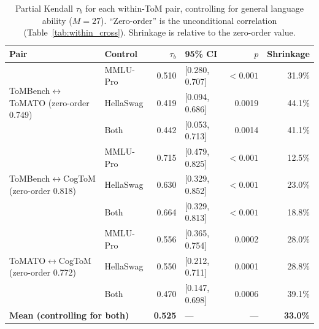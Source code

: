 \documentclass{article} %
\begin{document}
\begin{table}[h]
\centering
\small
\caption{Partial Kendall $\tau_b$ for each within-ToM pair, controlling for general language ability ($M=27$). ``Zero-order'' is the unconditional correlation (Table~\ref{tab:within_cross}). Shrinkage is relative to the zero-order value.}
\label{tab:partial_corr}
\begin{tabular}{llrlrr}
\toprule
Pair & Control & $\tau_b$ & 95\% CI & $p$ & Shrinkage \\
\midrule
\multirow{3}{*}{ToMBench$\leftrightarrow$ToMATO (zero-order 0.749)}
 & MMLU-Pro  & 0.510 & [0.280, 0.707] & $<0.001$ & 31.9\% \\
 & HellaSwag & 0.419 & [0.094, 0.686] & 0.0019 & 44.1\% \\
 & Both      & 0.442 & [0.053, 0.713] & 0.0014 & 41.1\% \\
\midrule
\multirow{3}{*}{ToMBench$\leftrightarrow$CogToM (zero-order 0.818)}
 & MMLU-Pro  & 0.715 & [0.479, 0.825] & $<0.001$ & 12.5\% \\
 & HellaSwag & 0.630 & [0.329, 0.852] & $<0.001$ & 23.0\% \\
 & Both      & 0.664 & [0.329, 0.813] & $<0.001$ & 18.8\% \\
\midrule
\multirow{3}{*}{ToMATO$\leftrightarrow$CogToM (zero-order 0.772)}
 & MMLU-Pro  & 0.556 & [0.365, 0.754] & 0.0002 & 28.0\% \\
 & HellaSwag & 0.550 & [0.212, 0.711] & 0.0001 & 28.8\% \\
 & Both      & 0.470 & [0.147, 0.698] & 0.0006 & 39.1\% \\
\midrule
\multicolumn{2}{l}{\textbf{Mean (controlling for both)}} & \textbf{0.525} & --- & --- & \textbf{33.0\%} \\
\bottomrule
\end{tabular}
\end{table}
 
\end{document}
